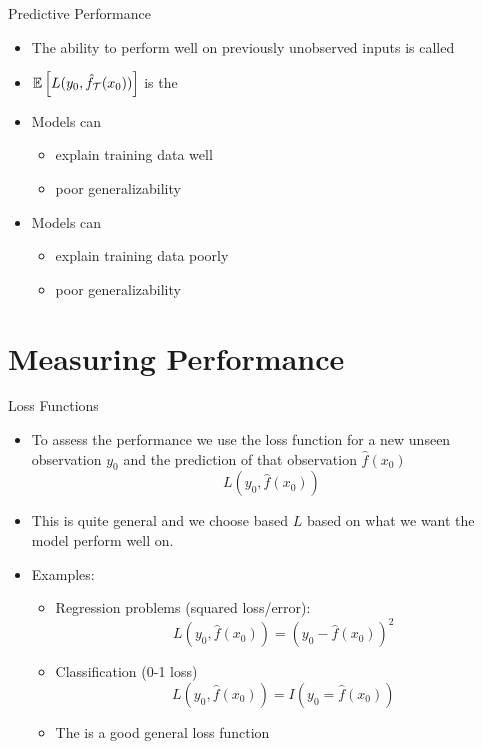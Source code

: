 \documentclass[10pt]{beamer}
\begin{document}
\begin{frame}{Predictive Performance}
\begin{itemize}
\item The ability to perform well on previously unobserved inputs is called 
\item $\operatorname{\mathbb{E}}\left[L(y_0,\hat{f}_\mathcal{T}(x_0))\right]$ is the 
\pause
\item Models can %
\begin{itemize}
\item explain training data well
\item poor generalizability
\end{itemize}
\pause
\item Models can 
\begin{itemize}
\item explain training data poorly
\item poor generalizability
\end{itemize}
\end{itemize}

\end{frame}

\section{Measuring Performance}
\frame{\sectionpage}

\begin{frame}{Loss Functions}



\begin{itemize}

\item To assess the performance we use the loss function for a new unseen observation $y_0$ and the prediction of that observation $\hat{f}(x_0)$
\[
L(y_0,\hat{f}(x_0))
\]
\pause
\item This is quite general and we choose based $L$ based on what we want the model perform well on.\pause
\item Examples:
\begin{itemize}
\item Regression problems (squared loss/error):
\[
    L(y_0,\hat{f}(x_0)) = (y_0 - \hat{f}(x_0))^2
\]
\pause
\item Classification (0-1 loss)
\[
    L(y_0,\hat{f}(x_0)) = I(y_0 = \hat{f}(x_0))
\]
\pause
\item The  is a good general loss function
\end{itemize}


\end{itemize}

\end{frame}
\end{document}

